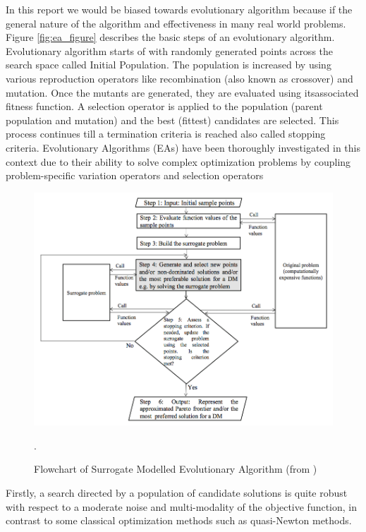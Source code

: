 \documentclass{newsig}
\begin{document}
 In this report we would be biased towards evolutionary algorithm because if the general nature of the algorithm and effectiveness in many real world problems. Figure \ref{fig:ea_figure} describes the basic steps of an evolutionary algorithm. Evolutionary algorithm starts of with randomly generated points across the search space called Initial Population. The population is increased by using various \textquotesingle reproduction \textquotesingle operators like recombination (also known as crossover) and mutation. Once the mutants are generated, they are evaluated using itsassociated fitness function. A selection operator is applied to the population (parent population and mutation) and the best (fittest) candidates  are selected. This process continues till a termination criteria is reached also called stopping criteria.
 Evolutionary Algorithms (EAs) have been thoroughly investigated in this context due
to their ability to solve complex optimization problems by coupling problem-specific variation
operators and selection operators

\begin{figure}[tbh]
\centering
\includegraphics[scale=0.5]{Figures/SurrogateModels}
\caption{Flowchart of Surrogate Modelled Evolutionary Algorithm (from \cite{tabatabaei2015survey})}.
\label{fig:surrogate_models}
\end{figure}

Firstly, a search directed by a population of candidate solutions is quite robust with respect
to a moderate noise and multi-modality of the objective function, in contrast to
some classical optimization methods such as quasi-Newton methods.
\end{document}
